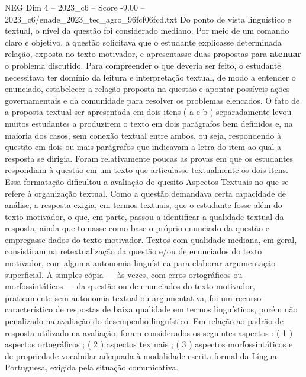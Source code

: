 \begin{textsample}{NEG Dim 4 – 2023\_c6 – Score -9.00 – 2023\_c6/enade\_2023\_tec\_agro\_96fcf06fcd.txt}
Do ponto de vista linguístico e textual, o nível da questão foi considerado mediano.
Por meio de um comando claro e objetivo, a questão solicitava que o estudante explicasse determinada relação, exposta no texto motivador, e apresentasse duas propostas para \textbf{atenuar} o problema discutido.
Para compreender o que deveria ser feito, o estudante necessitava ter domínio da leitura e interpretação textual, de modo a entender o enunciado, estabelecer a relação proposta na questão e apontar possíveis ações governamentais e da comunidade para resolver os problemas elencados.
O fato de a proposta textual ser apresentada em dois itens ( a e b ) separadamente levou muitos estudantes a produzirem o texto em dois parágrafos bem definidos e, na maioria dos casos, sem conexão textual entre ambos, ou seja, respondendo à questão em dois ou mais parágrafos que indicavam a letra do item ao qual a resposta se dirigia.
Foram relativamente poucas as provas em que os estudantes respondiam à questão em um texto que articulasse textualmente os dois itens.
Essa formatação dificultou a avaliação do quesito Aspectos Textuais no que se refere à organização textual.
Como a questão demandava certa capacidade de análise, a resposta exigia, em termos textuais, que o estudante fosse além do texto motivador, o que, em parte, passou a identificar a qualidade textual da resposta, ainda que tomasse como base o próprio enunciado da questão e empregasse dados do texto motivador.
Textos com qualidade mediana, em geral, consistiram na retextualização da questão e/ou de enunciados do texto motivador, com alguma autonomia linguística para elaborar argumentação superficial.
A simples cópia — às vezes, com erros ortográficos ou morfossintáticos — da questão ou de enunciados do texto motivador, praticamente sem autonomia textual ou argumentativa, foi um recurso característico de respostas de baixa qualidade em termos linguísticos, porém não penalizado na avaliação do desempenho linguístico.
Em relação ao padrão de resposta utilizado na avaliação, foram considerados os seguintes aspectos : ( 1 ) aspectos ortográficos ; ( 2 ) aspectos textuais ; ( 3 ) aspectos morfossintáticos e de propriedade vocabular adequada à modalidade escrita formal da Língua Portuguesa, exigida pela situação comunicativa.

\end{textsample}

